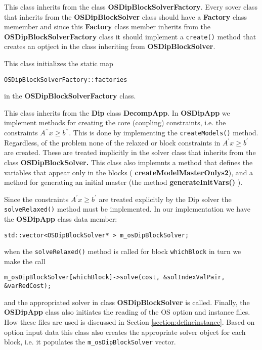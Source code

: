 \documentclass[11pt]{article}
\begin{document}
\vskip 8pt
  This class inherits from the class {\bf
OSDipBlockSolverFactory}. Every sover class that inherits from the  {\bf
OSDipBlockSolver} class should have a {\bf Factory} class memember and since
this {\bf Factory} class member inherits from the {\bf
OSDipBlockSolverFactory} class it should implement a {\tt create()} method that
creates an optject in the class inheriting from {\bf
OSDipBlockSolver}.

\vskip 8pt
  This class initializes the static map

\begin{verbatim}
OSDipBlockSolverFactory::factories
\end{verbatim}
in the {\bf OSDipBlockSolverFactory} class. 

\vskip 8pt
  This class inherits from the {\bf Dip} class {\bf
DecompApp}. In {\bf OSDipApp} we implement methods for creating the core
(coupling) constraints, i.e. the constraints $A^{\prime \prime} x \ge
b^{\prime \prime}$.  This is done by implementing the  {\tt createModels()}
method. Regardless, of the problem none of the relaxed or block constraints in $A^{\prime } x \ge
b^{\prime}$ are created. These are treated implicitly in the solver class that
inherits from the class {\bf OSDipBlockSolver.}  This class also implemnts a
method that defines the variables that appear only in the blocks ({\bf
createModelMasterOnlys2}), and a method for generating an initial master (the
method {\bf generateInitVars()  }). 

Since the constraints $A^{\prime } x \ge
b^{\prime}$ are treated explicitly by the Dip solver the {\tt solveRelaxed()}
method must be implemented. In our implementation we have the {\bf OSDipApp} class data
member:
\begin{verbatim}
std::vector<OSDipBlockSolver* > m_osDipBlockSolver;
\end{verbatim}
when the {\tt solveRelaxed()} method is called for block {\tt whichBlock} in
turn we make the call
\begin{verbatim}
m_osDipBlockSolver[whichBlock]->solve(cost, &solIndexValPair, &varRedCost);
\end{verbatim}
and the appropriated solver in class {\bf OSDipBlockSolver} is called. Finally,
the {\bf OSDipApp} class also  initiates the reading of the OS option and
instance files. How these files are used is discussed in Section \ref{section:defineinstance}. 
Based on option input
data this class also creates the appropriate solver object for each block, i.e.
it populates the {\tt  m\_osDipBlockSolver} vector.
\end{document}

